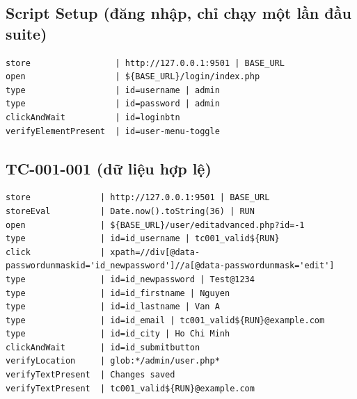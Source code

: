 \documentclass[12pt,a4paper]{article}
\begin{document}
\subsection{Script Setup (đăng nhập, chỉ chạy một lần đầu suite)}
\begin{lstlisting}
store                 | http://127.0.0.1:9501 | BASE_URL
open                  | ${BASE_URL}/login/index.php
type                  | id=username | admin
type                  | id=password | admin
clickAndWait          | id=loginbtn
verifyElementPresent  | id=user-menu-toggle
\end{lstlisting}

\subsection{TC-001-001 (dữ liệu hợp lệ)}
\begin{lstlisting}
store              | http://127.0.0.1:9501 | BASE_URL
storeEval          | Date.now().toString(36) | RUN
open               | ${BASE_URL}/user/editadvanced.php?id=-1
type               | id=id_username | tc001_valid${RUN}
click              | xpath=//div[@data-passwordunmaskid='id_newpassword']//a[@data-passwordunmask='edit']
type               | id=id_newpassword | Test@1234
type               | id=id_firstname | Nguyen
type               | id=id_lastname | Van A
type               | id=id_email | tc001_valid${RUN}@example.com
type               | id=id_city | Ho Chi Minh
clickAndWait       | id=id_submitbutton
verifyLocation     | glob:*/admin/user.php*
verifyTextPresent  | Changes saved
verifyTextPresent  | tc001_valid${RUN}@example.com
\end{lstlisting}
\end{document}
